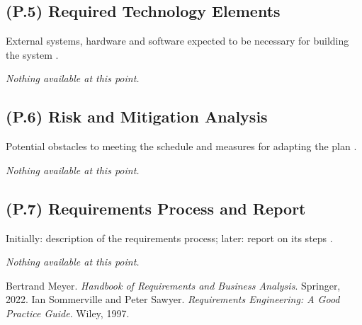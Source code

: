\documentclass[12pt,letterpaper]{article}
\begin{document}
\subsection{(P.5) Required Technology Elements}
External systems, hardware and software expected to be necessary for building the system \cite{meyer2022}.

\textit{Nothing available at this point.}

\subsection{(P.6) Risk and Mitigation Analysis}
Potential obstacles to meeting the schedule and measures for adapting the plan \cite{meyer2022}.

\textit{Nothing available at this point.}

\subsection{(P.7) Requirements Process and Report}
Initially: description of the requirements process; later: report on its steps \cite{meyer2022}.

\textit{Nothing available at this point.}

\clearpage

\begin{thebibliography}{9}
 Bertrand Meyer. \textit{Handbook of Requirements and Business Analysis}. Springer, 2022.
 Ian Sommerville and Peter Sawyer. \textit{Requirements Engineering: A Good Practice Guide}. Wiley, 1997.
\end{thebibliography}
\end{document}
